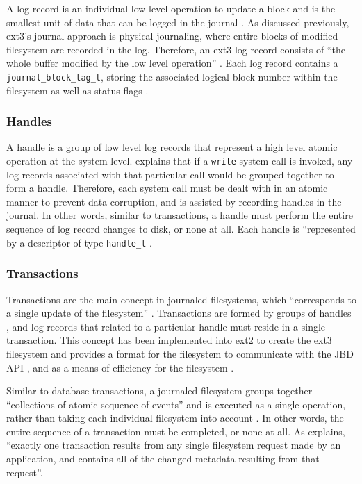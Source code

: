 A log record is an individual low level operation to update a block and is the smallest unit of data that can be logged in the journal \citep{Mauerer2008}. As discussed previously, ext3's journal approach is physical journaling, where entire blocks of modified filesystem are recorded in the log. Therefore, an ext3 log record consists of ``the whole buffer modified by the low level operation'' \citep[p. 770]{Bovet2006}. Each log record contains a \texttt{journal_block_tag_t}, storing the associated logical block number within the filesystem as well as status flags \citep{Bovet2006}.

\subsubsection{Handles}

A handle is a group of low level log records that represent a high level atomic operation at the system level. \citet[p. 639]{Mauerer2008} explains that if a \texttt{write} system call is invoked, any log records associated with that particular call would be grouped together to form a handle. Therefore, each system call must be dealt with in an atomic manner to prevent data corruption, and is assisted by recording handles in the journal. In other words, similar to transactions, a handle must perform the entire sequence of log record changes to disk, or none at all. Each handle is ``represented by a descriptor of type \texttt{handle_t} \citep[p. 770]{Bovet2006}.

\subsubsection{Transactions}

Transactions are the main concept in journaled filesystems, which ``corresponds to a single update of the filesystem'' \citep[p. 4]{Tweedie1998}. Transactions are formed by groups of handles \citep{Mauerer2008, Bovet2006}, and log records that related to a particular handle must reside in a single transaction. This concept has been implemented into ext2 to create the ext3 filesystem and provides a format for the filesystem to communicate with the JBD API \citep{Tweedie2000}, and as a means of efficiency for the filesystem \citep{Bovet2006}.

Similar to database transactions, a journaled filesystem groups together ``collections of atomic sequence of events'' and is executed as a single operation, rather than taking each individual filesystem into account \citep[p. 2]{Katiyar2011}. In other words, the entire sequence of a transaction must be completed, or none at all. As \citet[p. 4]{Tweedie2000} explains, ``exactly one transaction results from any single filesystem request made by an application, and contains all of the changed metadata resulting from that request''.

